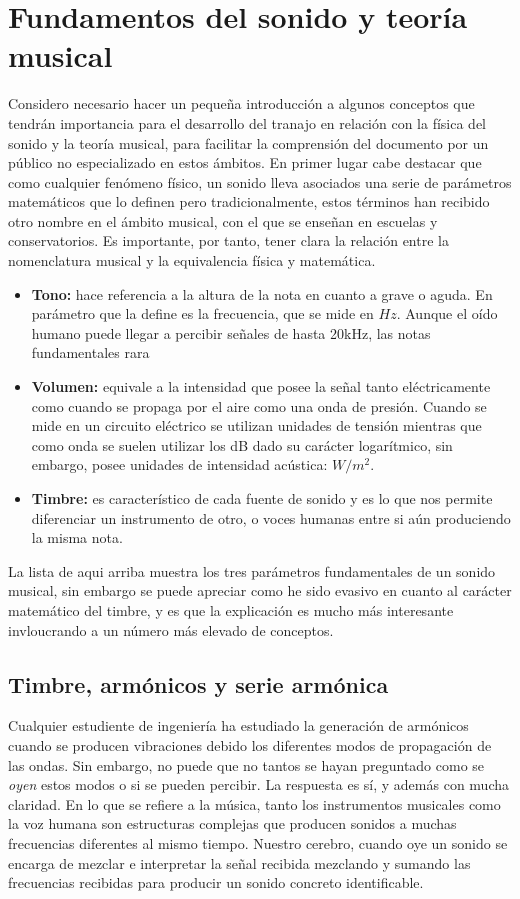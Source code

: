 \section{Fundamentos del sonido y teoría musical}
Considero necesario hacer un pequeña introducción a algunos conceptos que tendrán importancia para el desarrollo del tranajo en relación con la física del sonido y la teoría musical, para facilitar la comprensión del documento por un público no especializado en estos ámbitos. 
En primer lugar cabe destacar que como cualquier fenómeno físico, un sonido lleva asociados una serie de parámetros matemáticos que lo definen pero tradicionalmente, estos términos han recibido otro nombre en el ámbito musical, con el que se enseñan en escuelas y conservatorios. Es importante, por tanto, tener clara la relación entre la nomenclatura musical y la equivalencia física y matemática.
\begin{itemize}
\item \textbf{Tono:} hace referencia a la altura de la nota en cuanto a grave o aguda. En parámetro que la define es la frecuencia, que se mide en $Hz$. Aunque el oído humano puede llegar a percibir señales de hasta 20kHz, las notas fundamentales rara 
\item \textbf{Volumen:} equivale a la intensidad que posee la señal tanto eléctricamente como cuando se propaga por el aire como una onda de presión. Cuando se mide en un circuito eléctrico se utilizan unidades de tensión mientras que como onda se suelen utilizar los dB dado su carácter logarítmico, sin embargo, posee unidades de intensidad acústica: $W/m^{2}$.
\item\textbf{Timbre:} es característico de cada fuente de sonido y es lo que nos permite diferenciar un instrumento de otro, o voces humanas entre si aún produciendo la misma nota.
\end{itemize}

La lista de aqui arriba muestra los tres parámetros fundamentales de un sonido musical, sin embargo se puede apreciar como he sido evasivo en cuanto al carácter matemático del timbre, y es que la explicación es mucho más interesante invloucrando a un número más elevado de conceptos. 

\subsection{Timbre, armónicos y serie armónica}
Cualquier estudiente de ingeniería ha estudiado la generación de armónicos cuando se producen vibraciones debido los diferentes modos de propagación de las ondas. Sin embargo, no puede que no tantos se hayan preguntado como se \emph{oyen} estos modos o si se pueden percibir. La respuesta es sí, y además con mucha claridad. En lo que se refiere a la música, tanto los instrumentos musicales como la voz humana son estructuras complejas que producen sonidos a muchas frecuencias diferentes al mismo tiempo. Nuestro cerebro, cuando oye un sonido se encarga de mezclar e interpretar la señal recibida mezclando y sumando las frecuencias recibidas para producir un sonido concreto identificable. 

